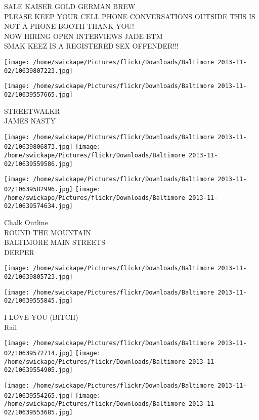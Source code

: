 \documentclass[10pt,letterpaper]{article}
\begin{document}
SALE KAISER GOLD GERMAN BREW\\
PLEASE KEEP YOUR CELL PHONE CONVERSATIONS OUTSIDE THIS IS NOT A PHONE BOOTH THANK YOU!\\
NOW HIRING OPEN INTERVIEWS JADE BTM\\
SMAK KEEZ IS A REGISTERED SEX OFFENDER!!!
\pagebreak

\texttt{[image: /home/swickape/Pictures/flickr/Downloads/Baltimore 2013-11-02/10639807223.jpg]}

\vspace{0.25in}
\texttt{[image: /home/swickape/Pictures/flickr/Downloads/Baltimore 2013-11-02/10639557665.jpg]}

STREETWALKR\\
JAMES NASTY
\pagebreak

\texttt{[image: /home/swickape/Pictures/flickr/Downloads/Baltimore 2013-11-02/10639806873.jpg]}
\texttt{[image: /home/swickape/Pictures/flickr/Downloads/Baltimore 2013-11-02/10639559586.jpg]}

\texttt{[image: /home/swickape/Pictures/flickr/Downloads/Baltimore 2013-11-02/10639582996.jpg]}
\texttt{[image: /home/swickape/Pictures/flickr/Downloads/Baltimore 2013-11-02/10639574634.jpg]}

Chalk Outline\\
ROUND THE MOUNTAIN\\
BALTIMORE MAIN STREETS\\
DERPER
\pagebreak

\texttt{[image: /home/swickape/Pictures/flickr/Downloads/Baltimore 2013-11-02/10639805723.jpg]}

\vspace{0.25in}
\texttt{[image: /home/swickape/Pictures/flickr/Downloads/Baltimore 2013-11-02/10639555845.jpg]}

I LOVE YOU (BITCH)\\
Rail
\pagebreak

\texttt{[image: /home/swickape/Pictures/flickr/Downloads/Baltimore 2013-11-02/10639572714.jpg]}
\texttt{[image: /home/swickape/Pictures/flickr/Downloads/Baltimore 2013-11-02/10639554905.jpg]}

\texttt{[image: /home/swickape/Pictures/flickr/Downloads/Baltimore 2013-11-02/10639554265.jpg]}
\texttt{[image: /home/swickape/Pictures/flickr/Downloads/Baltimore 2013-11-02/10639553685.jpg]}
\end{document}
